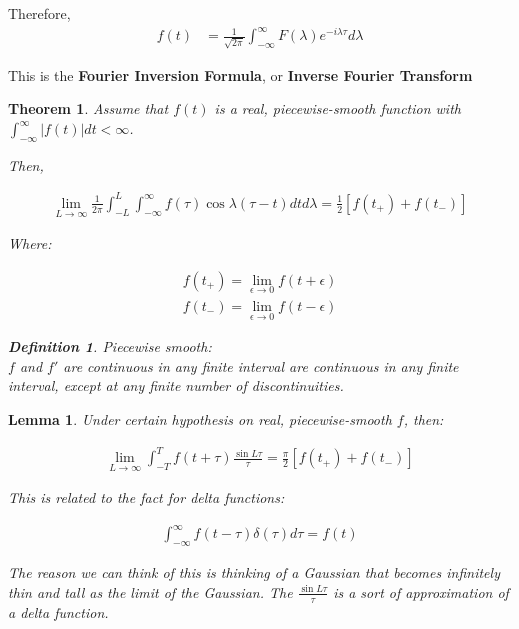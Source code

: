 \documentclass{article}
\newtheorem{theorem}{Theorem}[section]
\newtheorem{lemma}{Lemma}
\theoremstyle{definition}
\newtheorem{definition}{Definition}[section]
\newcommand{\Def}[2]{
\begin{shaded*}
\begin{definition}{\textit{#1}}\\#2\end{definition}
\end{shaded*}
}
\begin{document}
Therefore,
\begin{align*}
f(t) &= \frac{1}{\sqrt{2\pi}} \int_{-\infty}^\infty F(\lambda) e^{-i\lambda \tau} d\lambda 
\end{align*}

This is the \textbf{Fourier Inversion Formula}, or \textbf{Inverse Fourier Transform\\
}

\begin{theorem}
Assume that $f(t)$ is a real, piecewise-smooth function with $\int_{-\infty}^{\infty} |f(t)| dt < \infty $. 

Then, 

\begin{align*}
\lim_{L \to \infty } \frac{1}{2 \pi } \int_{-L}^{L} \int_{-\infty}^{\infty} f(\tau) \cos \lambda (\tau - t) dt d\lambda = \frac{1}{2} \left[f(t_+) + f(t_-)\right]
\end{align*}

Where:

\begin{align*}
f(t_+) = \lim_{\epsilon \to 0} f(t + \epsilon) \\ 
f(t_-) = \lim_{\epsilon \to 0} f(t - \epsilon)
\end{align*}



\Def{Piecewise smooth:} {$f$ and $f'$ are continuous in any finite interval are continuous in any finite interval, except at any finite number of discontinuities.}

\end{theorem}

\begin{lemma}
Under certain hypothesis on real, piecewise-smooth $f$, then:

\begin{align*}
\lim_{L \to  \infty} \int_{-T}^{T} f(t + \tau) \frac{\sin L\tau}{\tau} 
= \frac{\pi}{2} \left[f(t_+) + f(t_-)\right]
\end{align*}

This is related to the fact for delta functions:


\begin{align*}
\int_{-\infty}^{\infty} f(t - \tau) \delta(\tau) d\tau = f(t)
\end{align*}

The reason we can think of this is thinking of a Gaussian that becomes infinitely thin and tall as the limit of the Gaussian. The $\frac{\sin L\tau}{\tau} $ is a sort of approximation of a delta function.
\end{lemma}
\end{document}
